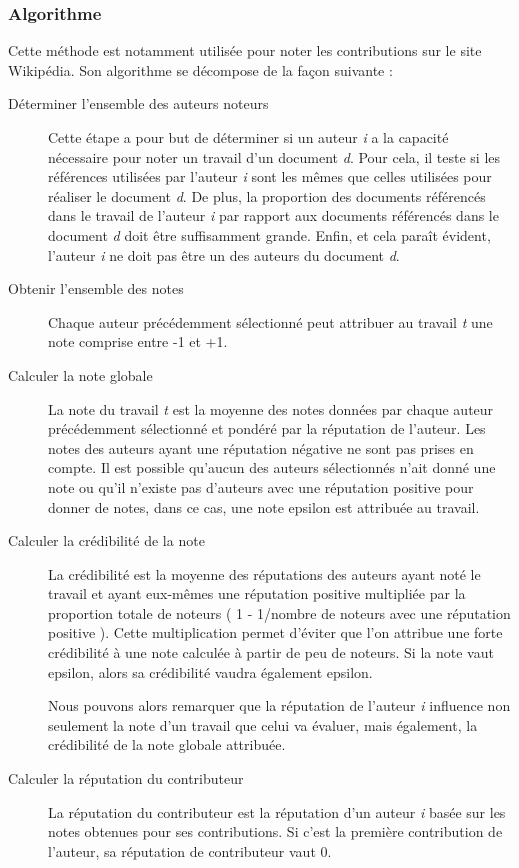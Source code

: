 \documentclass[a4paper, 11pt]{article} %
\begin{document}
\subsubsection{Algorithme}
Cette méthode est notamment utilisée pour noter les contributions sur le site Wikipédia. Son algorithme se décompose de la façon suivante :
\begin{description}
	\item[Déterminer l'ensemble des auteurs noteurs] Cette étape a pour but de déterminer si un auteur \textit{i} a la capacité nécessaire pour noter un travail d'un document \textit{d}. Pour cela, il teste si les références utilisées par l'auteur \textit{i} sont les mêmes que celles utilisées pour réaliser le document \textit{d}. De plus, la proportion des documents référencés dans le travail de l'auteur \textit{i} par rapport aux documents référencés dans le document \textit{d} doit être suffisamment grande. Enfin, et cela paraît évident, l'auteur \textit{i} ne doit pas être un des auteurs du document \textit{d}.
	\item[Obtenir l'ensemble des notes] Chaque auteur précédemment sélectionné peut attribuer au travail \textit{t} une note comprise entre -1 et +1.
	\item[Calculer la note globale] La note du travail \textit{t} est la moyenne des notes données par chaque auteur précédemment sélectionné et pondéré par la réputation de l'auteur. Les notes des auteurs ayant une réputation négative ne sont pas prises en compte. Il est possible qu'aucun des auteurs sélectionnés n'ait donné une note ou qu'il n'existe pas d'auteurs avec une réputation positive pour donner de notes, dans ce cas, une note epsilon est attribuée au travail.
	\item[Calculer la crédibilité de la note] La crédibilité est la moyenne des réputations des auteurs ayant noté le travail et ayant eux-mêmes une réputation positive multipliée par la proportion totale de noteurs ( 1 - 1/nombre de noteurs avec une réputation positive ). Cette multiplication permet d'éviter que l'on attribue une forte crédibilité à une note calculée à partir de peu de noteurs. Si la note vaut epsilon, alors sa crédibilité vaudra également epsilon.

Nous pouvons alors remarquer que la réputation de l'auteur \textit{i} influence non seulement la note d'un travail que celui va évaluer, mais également, la crédibilité de la note globale attribuée.

	\item[Calculer la réputation du contributeur] La réputation du contributeur est la réputation d'un auteur \textit{i} basée sur les notes obtenues pour ses contributions. Si c'est la première contribution de l'auteur, sa réputation de contributeur vaut 0.
\end{description}




\end{document}
